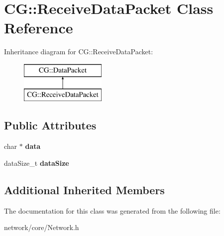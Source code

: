 \hypertarget{class_c_g_1_1_receive_data_packet}{}\section{CG\+:\+:Receive\+Data\+Packet Class Reference}
\label{class_c_g_1_1_receive_data_packet}
Inheritance diagram for CG\+:\+:Receive\+Data\+Packet\+:\begin{figure}[H]
\begin{center}
\leavevmode
\includegraphics[height=2.000000cm]{class_c_g_1_1_receive_data_packet}
\end{center}
\end{figure}
\subsection*{Public Attributes}
\begin{DoxyCompactItemize}
\item 
\mbox{\label{class_c_g_1_1_receive_data_packet_ad3098bb177c6a6b1fc47fe627c4c3390}} 
char $\ast$ {\bfseries data}
\item 
\mbox{\label{class_c_g_1_1_receive_data_packet_a01d949785d096b088ad7f3cf945cf082}} 
data\+Size\+\_\+t {\bfseries data\+Size}
\end{DoxyCompactItemize}
\subsection*{Additional Inherited Members}


The documentation for this class was generated from the following file\+:\begin{DoxyCompactItemize}
\item 
network/core/Network.\+h\end{DoxyCompactItemize}
